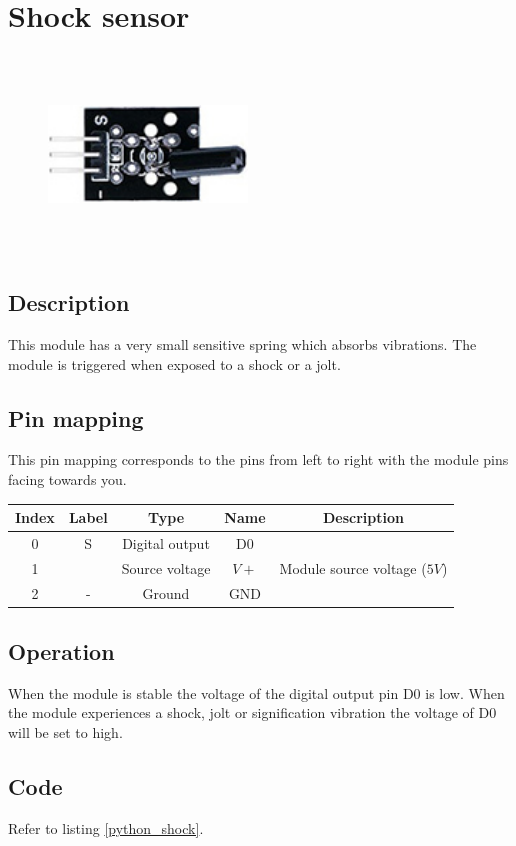 \section{Shock sensor}
\begin{figure}[H]
    \centering
    \includegraphics[angle=0, keepaspectratio=true, scale=1, width=200px, height=200px]{images/shock.jpg}
\end{figure}
\subsection*{Description}
This module has a very small sensitive spring which absorbs vibrations. The module is triggered when exposed to a shock or a jolt.
\subsection*{Pin mapping}
This pin mapping corresponds to the pins from left to right with the module pins facing towards you.
\begin{table}[H]
    \centering
    \begin{tabular}{|c|c|c|c|c|}
    \hline
    Index &Label &Type &Name &Description\\ \hline
    0 &S &Digital output &D0 &\\ \hline
    1 & &Source voltage &$V+$ &Module source voltage ($5V$)\\ \hline
    2 &- &Ground &GND &\\ \hline
    \end{tabular}
\end{table}
\subsection*{Operation}
When the module is stable the voltage of the digital output pin D0 is low. When the module experiences a shock, jolt or signification vibration the voltage of D0 will be set to high.
\subsection*{Code}
Refer to listing \ref{python_shock}.
%